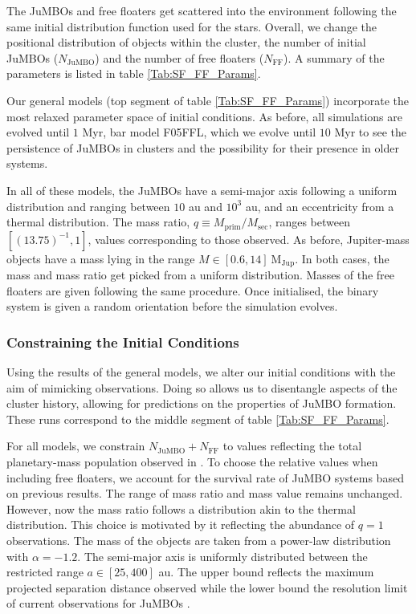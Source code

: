 \documentclass[aa]{aa}
\begin{document}
    The JuMBOs and free floaters get scattered into the environment following the same initial distribution function used for the stars. Overall, we change the positional distribution of objects within the cluster, the number of initial JuMBOs ($N_{\mathrm{JuMBO}}$) and the number of free floaters ($N_{\mathrm{FF}}$). A summary of the parameters is listed in table \ref{Tab:SF_FF_Params}.
    
    Our general models (top segment of table \ref{Tab:SF_FF_Params}) incorporate the most relaxed parameter space of initial conditions. As before, all simulations are evolved until $1$ Myr, bar model F05FFL, which we evolve until $10$ Myr to see the persistence of JuMBOs in clusters and the possibility for their presence in older systems. 
    
    In all of these models, the JuMBOs have a semi-major axis following a uniform distribution and ranging between $10$ au and $10^{3}$ au, and an eccentricity from a thermal distribution. The mass ratio, $q\equiv M_{\mathrm{prim}}/M_{\mathrm{sec}}$, ranges between $[(13.75)^{-1}, 1]$, values corresponding to those observed. As before, Jupiter-mass objects have a mass lying in the range $M\in[0.6, 14]\ \mathrm{M}_{\mathrm{Jup}}$. In both cases, the mass and mass ratio get picked from a uniform distribution. Masses of the free floaters are given following the same procedure. Once initialised, the binary system is given a random orientation before the simulation evolves.

 \subsubsection{Constraining the Initial Conditions}
    Using the results of the general models, we alter our initial conditions with the aim of mimicking observations. Doing so allows us to disentangle aspects of the cluster history, allowing for predictions on the properties of JuMBO formation. These runs correspond to the middle segment of table \ref{Tab:SF_FF_Params}.
    
    For all models, we constrain $N_{\mathrm{JuMBO}} + N_{\mathrm{FF}}$ to values reflecting the total planetary-mass population observed in \citet{2023arXiv231001231P}. To choose the relative values when including free floaters, we account for the survival rate of JuMBO systems based on previous results. The range of mass ratio and mass value remains unchanged. However, now the mass ratio follows a distribution akin to the thermal distribution. This choice is motivated by it reflecting the abundance of $q=1$ observations. The mass of the objects are taken from a power-law distribution with $\alpha = -1.2$. The semi-major axis is uniformly distributed between the restricted range $a\in[25, 400]$ au. The upper bound reflects the maximum projected separation distance observed while the lower bound the resolution limit of current observations for JuMBOs \citep{2023arXiv231001231P}. 
    
\end{document}
